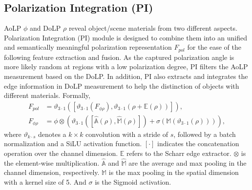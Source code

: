 \subsection{Polarization Integration (PI)}
AoLP $\phi$ and DoLP $\rho$ reveal object/scene materials from two different aspects. Polarization Integration (PI) module is designed to combine them into an unified and semantically meaningful polarization representation $F_{pol}$ for the ease of the following feature extraction and fusion. As the captured polarization angle is more likely random at regions with a low polarization degree, PI filters the AoLP measurement based on the DoLP. In addition, PI also extracts and integrates the edge information in DoLP measurement to help the distinction of objects with different materials. Formally,
\begin{align} \label{eq:pim}
    F_{pol} &=\vartheta_{3\cdot 1}([\vartheta_{3\cdot 1}(F_{\phi\rho}), \vartheta_{3\cdot 1}(\rho+\mathbb{E}(\rho))]), \\
    F_{\phi\rho} &=\phi\otimes(\vartheta_{3\cdot 1}([\hat{\mathbb{A}}(\rho),\hat{\mathbb{M}}(\rho)])+\sigma(\mathbb{M}(\vartheta_{3\cdot 1}(\rho)))),
\end{align}
where $\vartheta_{k\cdot s}$ denotes a $k \times k$ convolution with a stride of $s$, followed by a batch normalization and a SiLU activation function. $[\cdot]$ indicates the concatenation operation over the channel dimension. $\mathbb{E}$ refers to the Scharr edge extractor. $\otimes$ is the element-wise multiplication. $\hat{\mathbb{A}}$ and $\hat{\mathbb{M}}$ are the average and max pooling in the channel dimension, respectively. $\mathbb{M}$ is the max pooling in the spatial dimension with a kernel size of 5. And $\sigma$ is the Sigmoid activation.


